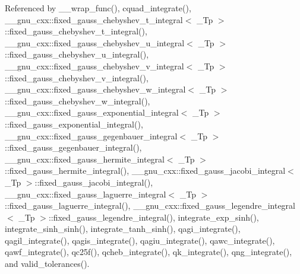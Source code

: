 Referenced by \+\_\+\+\_\+wrap\+\_\+func(), cquad\+\_\+integrate(), \+\_\+\+\_\+gnu\+\_\+cxx\+::fixed\+\_\+gauss\+\_\+chebyshev\+\_\+t\+\_\+integral$<$ \+\_\+\+Tp $>$\+::fixed\+\_\+gauss\+\_\+chebyshev\+\_\+t\+\_\+integral(), \+\_\+\+\_\+gnu\+\_\+cxx\+::fixed\+\_\+gauss\+\_\+chebyshev\+\_\+u\+\_\+integral$<$ \+\_\+\+Tp $>$\+::fixed\+\_\+gauss\+\_\+chebyshev\+\_\+u\+\_\+integral(), \+\_\+\+\_\+gnu\+\_\+cxx\+::fixed\+\_\+gauss\+\_\+chebyshev\+\_\+v\+\_\+integral$<$ \+\_\+\+Tp $>$\+::fixed\+\_\+gauss\+\_\+chebyshev\+\_\+v\+\_\+integral(), \+\_\+\+\_\+gnu\+\_\+cxx\+::fixed\+\_\+gauss\+\_\+chebyshev\+\_\+w\+\_\+integral$<$ \+\_\+\+Tp $>$\+::fixed\+\_\+gauss\+\_\+chebyshev\+\_\+w\+\_\+integral(), \+\_\+\+\_\+gnu\+\_\+cxx\+::fixed\+\_\+gauss\+\_\+exponential\+\_\+integral$<$ \+\_\+\+Tp $>$\+::fixed\+\_\+gauss\+\_\+exponential\+\_\+integral(), \+\_\+\+\_\+gnu\+\_\+cxx\+::fixed\+\_\+gauss\+\_\+gegenbauer\+\_\+integral$<$ \+\_\+\+Tp $>$\+::fixed\+\_\+gauss\+\_\+gegenbauer\+\_\+integral(), \+\_\+\+\_\+gnu\+\_\+cxx\+::fixed\+\_\+gauss\+\_\+hermite\+\_\+integral$<$ \+\_\+\+Tp $>$\+::fixed\+\_\+gauss\+\_\+hermite\+\_\+integral(), \+\_\+\+\_\+gnu\+\_\+cxx\+::fixed\+\_\+gauss\+\_\+jacobi\+\_\+integral$<$ \+\_\+\+Tp $>$\+::fixed\+\_\+gauss\+\_\+jacobi\+\_\+integral(), \+\_\+\+\_\+gnu\+\_\+cxx\+::fixed\+\_\+gauss\+\_\+laguerre\+\_\+integral$<$ \+\_\+\+Tp $>$\+::fixed\+\_\+gauss\+\_\+laguerre\+\_\+integral(), \+\_\+\+\_\+gnu\+\_\+cxx\+::fixed\+\_\+gauss\+\_\+legendre\+\_\+integral$<$ \+\_\+\+Tp $>$\+::fixed\+\_\+gauss\+\_\+legendre\+\_\+integral(), integrate\+\_\+exp\+\_\+sinh(), integrate\+\_\+sinh\+\_\+sinh(), integrate\+\_\+tanh\+\_\+sinh(), qagi\+\_\+integrate(), qagil\+\_\+integrate(), qagis\+\_\+integrate(), qagiu\+\_\+integrate(), qawc\+\_\+integrate(), qawf\+\_\+integrate(), qc25f(), qcheb\+\_\+integrate(), qk\+\_\+integrate(), qng\+\_\+integrate(), and valid\+\_\+tolerances().

\mbox{\label{namespace____gnu__cxx_aeff8a54364ae3976f593b8699626a897}} 
